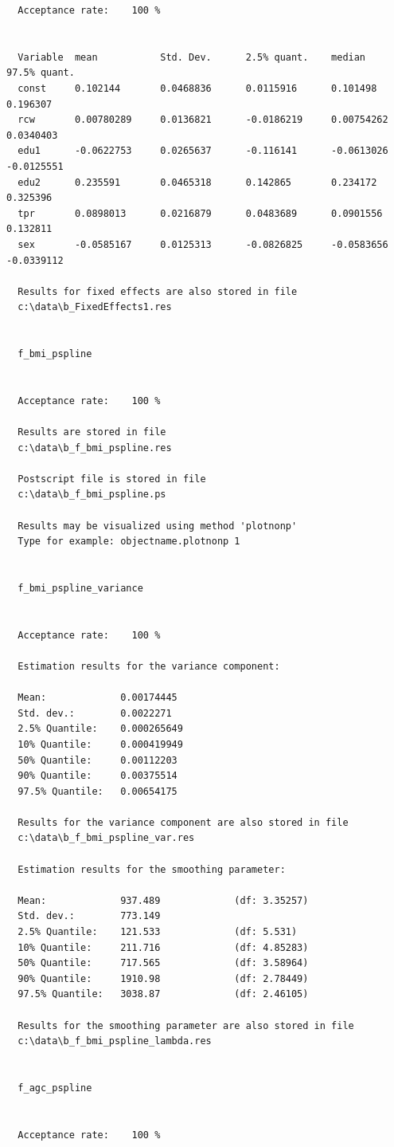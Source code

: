\begin{verbatim}
  Acceptance rate:    100 %


  Variable  mean           Std. Dev.      2.5% quant.    median         97.5% quant.
  const     0.102144       0.0468836      0.0115916      0.101498       0.196307
  rcw       0.00780289     0.0136821      -0.0186219     0.00754262     0.0340403
  edu1      -0.0622753     0.0265637      -0.116141      -0.0613026     -0.0125551
  edu2      0.235591       0.0465318      0.142865       0.234172       0.325396
  tpr       0.0898013      0.0216879      0.0483689      0.0901556      0.132811
  sex       -0.0585167     0.0125313      -0.0826825     -0.0583656     -0.0339112

  Results for fixed effects are also stored in file
  c:\data\b_FixedEffects1.res


  f_bmi_pspline


  Acceptance rate:    100 %

  Results are stored in file
  c:\data\b_f_bmi_pspline.res

  Postscript file is stored in file
  c:\data\b_f_bmi_pspline.ps

  Results may be visualized using method 'plotnonp'
  Type for example: objectname.plotnonp 1


  f_bmi_pspline_variance


  Acceptance rate:    100 %

  Estimation results for the variance component:

  Mean:             0.00174445
  Std. dev.:        0.0022271
  2.5% Quantile:    0.000265649
  10% Quantile:     0.000419949
  50% Quantile:     0.00112203
  90% Quantile:     0.00375514
  97.5% Quantile:   0.00654175

  Results for the variance component are also stored in file
  c:\data\b_f_bmi_pspline_var.res

  Estimation results for the smoothing parameter:

  Mean:             937.489             (df: 3.35257)
  Std. dev.:        773.149
  2.5% Quantile:    121.533             (df: 5.531)
  10% Quantile:     211.716             (df: 4.85283)
  50% Quantile:     717.565             (df: 3.58964)
  90% Quantile:     1910.98             (df: 2.78449)
  97.5% Quantile:   3038.87             (df: 2.46105)

  Results for the smoothing parameter are also stored in file
  c:\data\b_f_bmi_pspline_lambda.res


  f_agc_pspline


  Acceptance rate:    100 %


\end{verbatim}
